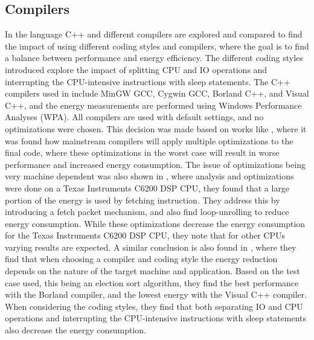 \subsection{Compilers}
In \cite{hassan2017} the language C++ and different compilers are explored and compared to find the impact of using different coding styles and compilers, where the goal is to find a balance between performance and energy efficiency. The different coding styles introduced explore the impact of splitting CPU and IO operations and interrupting the CPU-intensive instructions with sleep statements. The C++ compilers used in \cite{hassan2017} include MinGW GCC, Cygwin GCC, Borland C++, and Visual C++, and the energy measurements are performed using Windows Performance Analyses (WPA). All compilers are used with default settings, and no optimizations were chosen. This decision was made based on works like \cite{lima2013}, where it was found how mainstream compilers will apply multiple optimizations to the final code, where these optimizations in the worst case will result in worse performance and increased energy consumption. The issue of optimizations being very machine dependent was also shown in \cite{cooper2004}, where analysis and optimizations were done on a Texas Instruments C6200 DSP CPU, they found that a large portion of the energy is used by fetching instruction. They address this by introducing a fetch packet mechanism, and also find loop-unrolling to reduce energy consumption. While these optimizations decrease the energy consumption for the Texas Instruments C6200 DSP CPU, they note that for other CPUs varying results are expected. A similar conclusion is also found in \cite{hassan2017}, where they find that when choosing a compiler and coding style the energy reduction depends on the nature of the target machine and application. Based on the test case used, this being an election sort algorithm, they find the best performance with the Borland compiler, and the lowest energy with the Visual C++ compiler. When considering the coding styles, they find that both separating IO and CPU operations and interrupting the CPU-intensive instructions with sleep statements also decrease the energy consumption.
